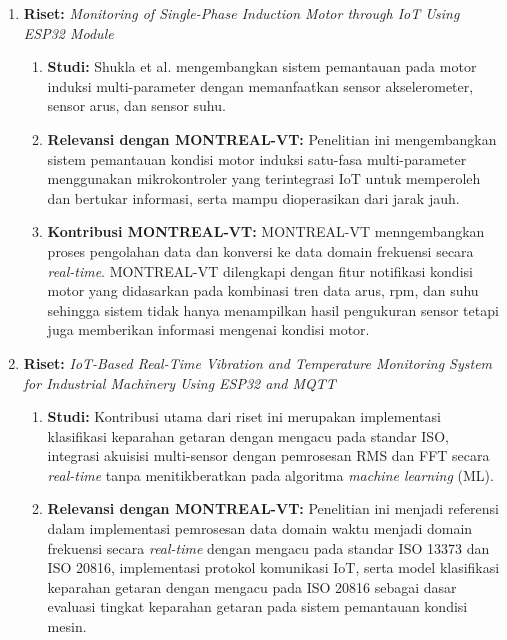\documentclass{elsinta}
\begin{document}
\begin{enumerate}
\begin{enumerate}
        \item \textbf{Relevansi dengan  MONTREAL-VT:} Metodologi VAT menjadi dasar dalam proses akuisisi data getaran dari motor induksi. MONTREAL-VT mengadopsi sensor getaran sebagai media pengumpulan data.
        \item \textbf{Kontribusi  MONTREAL-VT:} MONTREAL-VT memperluas pendekatan riset\cite{1.1.17} dengan parameter tambahan seperti rpm, suhu, dan arus sehingga proses diagnosis tidak hanya mengandalkan data getaran motor. MONTREAL-VT dibekali sistem peunggahan data berbasis cloud sehingga pengguna dapat mengakses data hasil akuisisi dan diagnosa kondisi motor.
    \end{enumerate}
    \item \textbf{Riset:} \textit{Monitoring of Single-Phase Induction Motor through IoT Using ESP32 Module} \cite{2.1.6}
    \begin{enumerate}
        \item \textbf{Studi:} Shukla et al. mengembangkan sistem pemantauan pada motor induksi multi-parameter dengan memanfaatkan sensor akselerometer, sensor arus, dan sensor suhu.
        \item \textbf{Relevansi dengan MONTREAL-VT:} Penelitian ini mengembangkan sistem pemantauan kondisi motor induksi satu-fasa multi-parameter menggunakan mikrokontroler yang terintegrasi IoT untuk memperoleh dan bertukar informasi, serta mampu dioperasikan dari jarak jauh.
        \item \textbf{Kontribusi MONTREAL-VT:} MONTREAL-VT menngembangkan proses pengolahan data dan konversi ke data domain frekuensi secara \textit{real-time}. MONTREAL-VT dilengkapi dengan fitur notifikasi kondisi motor yang didasarkan pada kombinasi tren data arus, rpm, dan suhu sehingga sistem tidak hanya menampilkan hasil pengukuran sensor tetapi juga memberikan informasi mengenai kondisi motor.
    \end{enumerate}
    \item \textbf{Riset:} \textit{IoT-Based Real-Time Vibration and Temperature Monitoring System for Industrial Machinery Using ESP32 and MQTT}\cite{2.1.7}
    \begin{enumerate}
        \item \textbf{Studi:} Kontribusi utama dari riset ini merupakan implementasi klasifikasi keparahan getaran dengan mengacu pada standar ISO, integrasi akuisisi multi-sensor dengan pemrosesan RMS dan FFT secara \textit{real-time} tanpa menitikberatkan pada algoritma \textit{machine learning} (ML).
        \item \textbf{Relevansi dengan MONTREAL-VT:} Penelitian ini menjadi referensi dalam implementasi pemrosesan data domain waktu menjadi domain frekuensi secara \textit{real-time} dengan mengacu pada standar ISO 13373 dan ISO 20816, implementasi protokol komunikasi IoT, serta model klasifikasi keparahan getaran dengan mengacu pada ISO 20816 sebagai dasar evaluasi tingkat keparahan getaran pada sistem pemantauan kondisi mesin.

\end{enumerate}
\end{enumerate}
\end{document}
